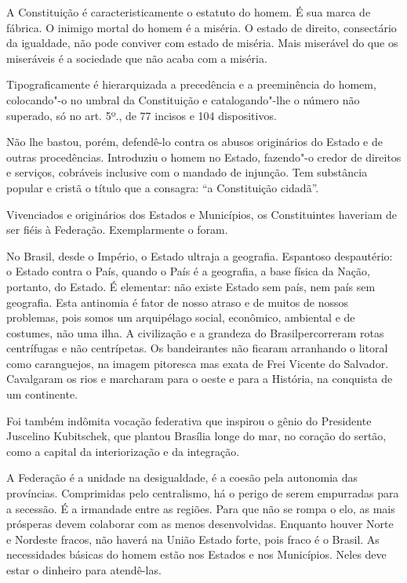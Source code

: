 A Constituição é caracteristicamente o estatuto do homem. É sua marca de
fábrica. O inimigo mortal do homem é a miséria. O estado de direito,
consectário da igualdade, não pode conviver com estado de miséria. Mais
miserável do que os miseráveis é a sociedade que não acaba com a
miséria.

Tipograficamente é hierarquizada a precedência e a preeminência do
homem, colocando"-o no umbral da Constituição e catalogando"-lhe o número
não superado, só no art. 5º., de 77 incisos e 104 dispositivos.

Não lhe bastou, porém, defendê-lo contra os abusos originários do Estado
e de outras procedências. Introduziu o homem no Estado, fazendo"-o credor
de direitos e serviços, cobráveis inclusive com o mandado de injunção.
Tem substância popular e cristã o título que a consagra: ``a
Constituição cidadã''.

Vivenciados e originários dos Estados e Municípios, os Constituintes
haveriam de ser fiéis à Federação. Exemplarmente o foram.

No Brasil, desde o Império, o Estado ultraja a geografia. Espantoso
despautério: o Estado contra o País, quando o País é a geografia, a base
física da Nação, portanto, do Estado. É elementar: não existe Estado sem
país, nem país sem geografia. Esta antinomia é fator de nosso atraso e
de muitos de nossos problemas, pois somos um arquipélago social,
econômico, ambiental e de costumes, não uma ilha. A civilização e a
grandeza do Brasilpercorreram rotas centrífugas e não centrípetas. Os
bandeirantes não ficaram arranhando o litoral como caranguejos, na
imagem pitoresca mas exata de Frei Vicente do Salvador. Cavalgaram os
rios e marcharam para o oeste e para a História, na conquista de um
continente.

Foi também indômita vocação federativa que inspirou o gênio do
Presidente Juscelino Kubitschek, que plantou Brasília longe do mar, no
coração do sertão, como a capital da interiorização e da integração.

A Federação é a unidade na desigualdade, é a coesão pela autonomia das
províncias. Comprimidas pelo centralismo, há o perigo de serem
empurradas para a secessão. É a irmandade entre as regiões. Para que não
se rompa o elo, as mais prósperas devem colaborar com as menos
desenvolvidas. Enquanto houver Norte e Nordeste fracos, não haverá na
União Estado forte, pois fraco é o Brasil. As necessidades básicas do
homem estão nos Estados e nos Municípios. Neles deve estar o dinheiro
para atendê-las.

